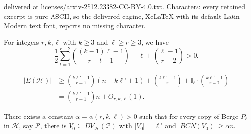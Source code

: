 \documentclass[10pt,a4paper]{amsart}
\newcommand{\mh}{\mathcal{H}}
\begin{document}
delivered at licenses/arxiv-2512.23382-CC-BY-4.0.txt. Characters: every retained excerpt is pure ASCII, so the delivered engine, XeLaTeX with its default Latin Modern text font, reports no missing character.
   \begin{lemma}\label{lem: the ineuqlaity in sec 3 (2)}
 For integers $r,k,\ell$ with $k\geq 3$ and $\ell\geq r\geq 3$, we have
     $$\frac{1}{2}\sum_{t=1}^{r-2}\binom{(k-1)\ell-1}{r-t-1}-\ell+\binom{\ell-1}{r-2}>0.$$
 \end{lemma}

 \begin{align}\label{3-2}
|E(\mh)|&\ge {k\ell'-1\choose r-1}(n-k\ell'+1)+{k\ell'-1\choose r}+\mathbb{I}_\ell\cdot\binom{k\ell'-1}{r-2}\\
&= \binom{k\ell'-1}{r-1}n+O_{r,k,\ell}(1)\nonumber.
\end{align}

 \begin{lemma}\label{lem: enough Berge common}
     There exists a constant $\alpha=\alpha(r,k,\ell)>0$ such that for every copy of Berge-$P_{\ell}$ in $\mathcal{H}$, say $\mathcal{P}$, there is $V_0\subseteq DV_\mh(\mathcal{P})$ with $|V_0|=
     \ell'$ and $|BCN(V_0)|\ge\alpha n$.
 \end{lemma}
\end{document}
